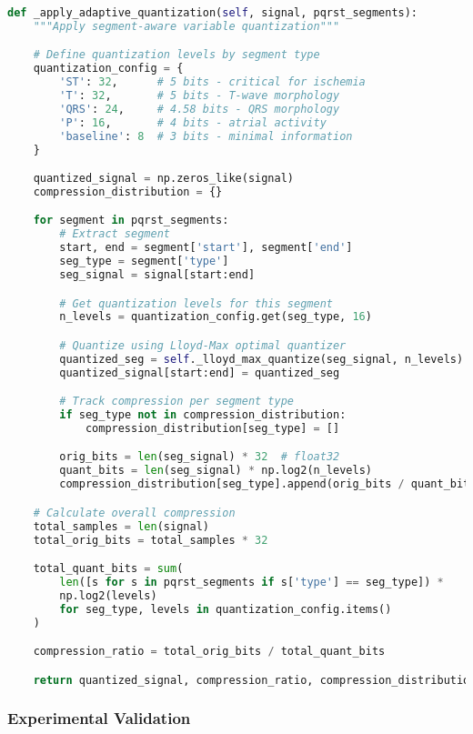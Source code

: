 \documentclass[11pt]{article}
\begin{document}
\begin{lstlisting}[language=Python, caption=Adaptive Quantization Implementation]
def _apply_adaptive_quantization(self, signal, pqrst_segments):
    """Apply segment-aware variable quantization"""

    # Define quantization levels by segment type
    quantization_config = {
        'ST': 32,      # 5 bits - critical for ischemia
        'T': 32,       # 5 bits - T-wave morphology
        'QRS': 24,     # 4.58 bits - QRS morphology
        'P': 16,       # 4 bits - atrial activity
        'baseline': 8  # 3 bits - minimal information
    }

    quantized_signal = np.zeros_like(signal)
    compression_distribution = {}

    for segment in pqrst_segments:
        # Extract segment
        start, end = segment['start'], segment['end']
        seg_type = segment['type']
        seg_signal = signal[start:end]

        # Get quantization levels for this segment
        n_levels = quantization_config.get(seg_type, 16)

        # Quantize using Lloyd-Max optimal quantizer
        quantized_seg = self._lloyd_max_quantize(seg_signal, n_levels)
        quantized_signal[start:end] = quantized_seg

        # Track compression per segment type
        if seg_type not in compression_distribution:
            compression_distribution[seg_type] = []

        orig_bits = len(seg_signal) * 32  # float32
        quant_bits = len(seg_signal) * np.log2(n_levels)
        compression_distribution[seg_type].append(orig_bits / quant_bits)

    # Calculate overall compression
    total_samples = len(signal)
    total_orig_bits = total_samples * 32

    total_quant_bits = sum(
        len([s for s in pqrst_segments if s['type'] == seg_type]) *
        np.log2(levels)
        for seg_type, levels in quantization_config.items()
    )

    compression_ratio = total_orig_bits / total_quant_bits

    return quantized_signal, compression_ratio, compression_distribution
\end{lstlisting}

\subsubsection{Experimental Validation}
\end{document}
